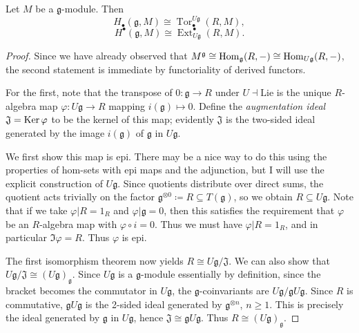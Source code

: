 \begin{corollary}\label{7.3.3}
	Let $M$ be a $\mathfrak{g} $-module. Then
	\[
		H_{\bullet} (\mathfrak{g} ,M) \cong \operatorname{Tor} _{\bullet} ^{U\mathfrak{g} } (R,M)
	,\]
	\[
		H^{\bullet} (\mathfrak{g} ,M)\cong \operatorname{Ext}_{U\mathfrak{g} } ^{\bullet} (R,M)
	.\]
\end{corollary}
\begin{proof}
	Since we have already observed that $M^\mathfrak{g} \cong \operatorname{Hom}_\mathfrak{g} (R,-) \cong \operatorname{Hom}_{U\mathfrak{g} } (R,-)$, the second statement is immediate by functoriality of derived functors.

	For the first, note that the transpose of $0: \mathfrak{g}  \to R$ under $U\dashv \mathrm{Lie} $ is the unique $R$-algebra map $\varphi : U\mathfrak{g} \to R$ mapping $i(\mathfrak{g})\mapsto 0$. Define the \emph{augmentation ideal} $\mathfrak{J} =\operatorname{Ker} \varphi $ to be the kernel of this map; evidently $\mathfrak{J} $ is the two-sided ideal generated by the image $i(\mathfrak{g}) $ of $\mathfrak{g} $ in $U\mathfrak{g} $.

	We first show this map is epi. There may be a nice way to do this using the properties of hom-sets with epi maps and the adjunction, but I will use the explicit construction of $U\mathfrak{g} $. Since quotients distribute over direct sums, the quotient acts trivially on the factor $\mathfrak{g} ^{\otimes 0} \coloneqq R\subseteq T(\mathfrak{g} )$, so we obtain $R\subseteq U\mathfrak{g} $. Note that if we take $\varphi |R = 1_R$ and $\varphi |\mathfrak{g} =0$, then this satisfies the requirement that $\varphi $ be an $R$-algebra map with $\varphi \circ i=0$. Thus we must have $\varphi |R=1_R$, and in particular $\Im \varphi =R$. Thus $\varphi $ is epi.

	The first isomorphism theorem now yields $R \cong U\mathfrak{g} /\mathfrak{J} $. We can also show that $U\mathfrak{g} /\mathfrak{J} \cong (U\mathfrak{g} )_\mathfrak{g} $. Since $U\mathfrak{g} $ is a $\mathfrak{g} $-module essentially by definition, since the bracket becomes the commutator in $U\mathfrak{g} $, the $\mathfrak{g} $-coinvariants are $U\mathfrak{g} /\mathfrak{g} U\mathfrak{g} $. Since $R$ is commutative, $\mathfrak{g} U\mathfrak{g} $ is the 2-sided ideal generated by $\mathfrak{g} ^{\otimes n} $, $n\geq 1$. This is precisely the ideal generated by $\mathfrak{g} $ in $U\mathfrak{g} $, hence $\mathfrak{J}\cong \mathfrak{g} U\mathfrak{g} $. Thus $R \cong (U\mathfrak{g} )_\mathfrak{g} $.


\end{proof}
